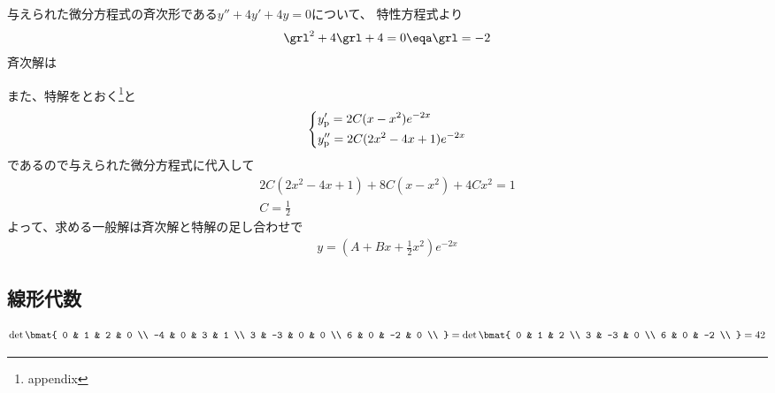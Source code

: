 
\begin{ans*}
  与えられた微分方程式の斉次形である$y'' + 4y' + 4y = 0$について、
  特性方程式より
  \begin{gather}
    \grl^2+4\grl+4=0\eqa \grl = -2
  \end{gather}
  斉次解は

  また、特解をとおく\footnote{appendix}と
  \begin{gather}
    \begin{dcases*}
      y'_{\rm{p}} = 2C(x-x^2)e^{-2x} \\
      y''_{\rm{p}}= 2C(2x^2-4x+1)e^{-2x}
    \end{dcases*}
  \end{gather}
  であるので与えられた微分方程式に代入して
  \begin{gather}
    2C(2x^2 - 4x + 1) + 8C(x-x^2) + 4Cx^2 = 1 \\
    C = \frac{1}{2}
  \end{gather}
  よって、求める一般解は斉次解と特解の足し合わせで
  \begin{gather}
    y = \left(A + Bx + \frac{1}{2}x^2\right)e^{-2x}
  \end{gather}
\end{ans*}


\newpage
\subsection{線形代数}
\begin{ans*}
  \begin{align}
    \det
    \bmat{
      0 & 1 & 2 & 0 \\
      -4 & 0 & 3 & 1 \\
      3 & -3 & 0 & 0 \\
      6 & 0 & -2 & 0 \\
    }
    = \det
    \bmat{
      0  & 1  & 2  \\
      3  & -3 & 0  \\
      6  & 0  & -2 \\
    }
    = 42
  \end{align}
\end{ans*}

